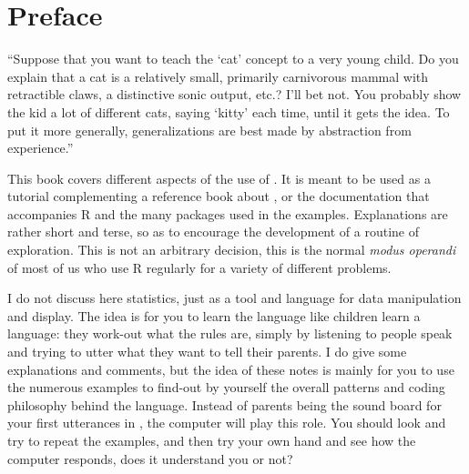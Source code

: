 \chapter*{Preface}

\begin{VF}
``Suppose that you want to teach the `cat' concept to a very young child. Do you explain that a cat is a relatively small, primarily carnivorous mammal with retractible claws, a distinctive sonic output, etc.? I'll bet not. You probably show the kid a lot of different cats, saying `kitty' each time, until it gets the idea. To put it more generally, generalizations are best made by abstraction from experience.''

\end{VF}




\vspace{2ex}This book covers different aspects of the use of \Rpgrm. It is meant to be used as a tutorial complementing a reference book about \R, or the documentation that accompanies R and the many packages used in the examples. Explanations are rather short and terse, so as to encourage the development of a routine of exploration. This is not an arbitrary decision, this is the normal \emph{modus operandi} of most of us who use R regularly for a variety of different problems.

I do not discuss here statistics, just \Rpgrm as a tool and language for data manipulation and display. The idea is for you to learn the \Rpgrm language like children learn a language: they work-out what the rules are, simply by listening to people speak and trying to utter what they want to tell their parents. I do give some explanations and comments, but the idea of these notes is mainly for you to use the numerous examples to find-out by yourself the overall patterns and coding philosophy behind the \Rpgrm language. Instead of parents being the sound board for your first utterances in , the computer will play this role. You should look and try to repeat the examples, and then try your own hand and see how the computer responds, does it understand you or not?

